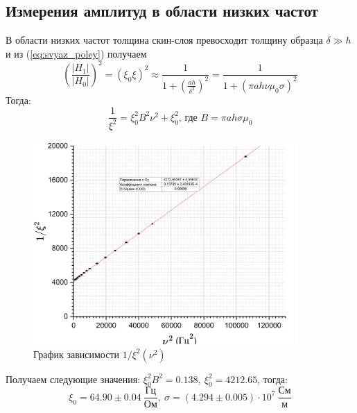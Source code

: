 \documentclass[a4paper, 12pt]{article}
\begin{document}
	\subsection*{Измерения амплитуд в области низких частот}
	В области низких частот толщина скин-слоя превосходит толщину образца $ \delta \gg h$  и из (\ref{eq:svyaz_poley}) получаем
	\begin{equation*}
		\left(\frac{|H_1|}{|H_0|}\right)^2 = (\xi_0\xi)^2 \approx \frac{1}{1+\left(\frac{ah}{\delta^2}\right)^2} = \frac{1}{1 + \left(\pi ah\nu\mu_0\sigma\right)^2}
	\end{equation*}
	Тогда: 
	\begin{equation*}
		\frac{1}{\xi^2}=\xi_0^2B^2\nu^2 + \xi_0^2 \text{, где } B=\pi a h \sigma \mu_0
		\label{eq:liniya_dlya_c}
	\end{equation*}
	\begin{figure}[h!]
		\centering
		\includegraphics[width=0.9\textwidth, height = 0.45\textheight]{Low_Freq}
		\caption{График зависимости $1/\xi^2(\nu^2)$}\label{fig:xi_nu_low_freq_linearized}
	\end{figure}
	Получаем следующие значения: $\xi_0^2B^2 = 0.138, \ \xi_0^2 = 4212.65$, тогда:
	\[\xi_0 = 64.90 \pm 0.04 \ \frac{\text{Гц}}{\text{Ом}}, \ \sigma = (4.294 \pm 0.005) \cdot 10^7 \ \frac{\text{См}}{\text{м}}  \]
	
\end{document}
